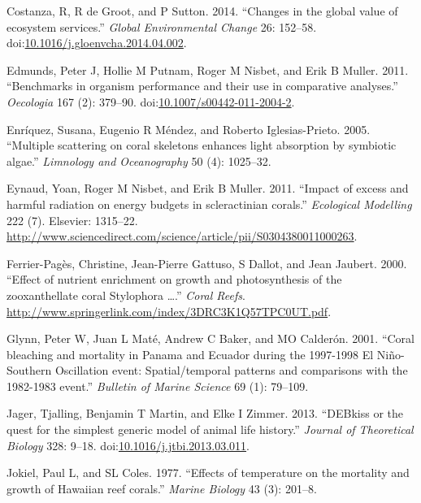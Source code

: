 \documentclass[]{elsarticle} %
\begin{document}
\hypertarget{refs}{}
\hypertarget{ref-Costanza:2014ex}{}
Costanza, R, R de Groot, and P Sutton. 2014. ``Changes in the global
value of ecosystem services.'' \emph{Global Environmental Change} 26:
152--58.
doi:\href{https://doi.org/10.1016/j.gloenvcha.2014.04.002}{10.1016/j.gloenvcha.2014.04.002}.

\hypertarget{ref-Edmunds:2011bv}{}
Edmunds, Peter J, Hollie M Putnam, Roger M Nisbet, and Erik B Muller.
2011. ``Benchmarks in organism performance and their use in comparative
analyses.'' \emph{Oecologia} 167 (2): 379--90.
doi:\href{https://doi.org/10.1007/s00442-011-2004-2}{10.1007/s00442-011-2004-2}.

\hypertarget{ref-Enriquez:2005p142}{}
Enríquez, Susana, Eugenio R Méndez, and Roberto Iglesias-Prieto. 2005.
``Multiple scattering on coral skeletons enhances light absorption by
symbiotic algae.'' \emph{Limnology and Oceanography} 50 (4): 1025--32.

\hypertarget{ref-Eynaud:2011tv}{}
Eynaud, Yoan, Roger M Nisbet, and Erik B Muller. 2011. ``Impact of
excess and harmful radiation on energy budgets in scleractinian
corals.'' \emph{Ecological Modelling} 222 (7). Elsevier: 1315--22.
\url{http://www.sciencedirect.com/science/article/pii/S0304380011000263}.

\hypertarget{ref-FerrierPages:2000p1950}{}
Ferrier-Pagès, Christine, Jean-Pierre Gattuso, S Dallot, and Jean
Jaubert. 2000. ``Effect of nutrient enrichment on growth and
photosynthesis of the zooxanthellate coral Stylophora \ldots{}.''
\emph{Coral Reefs}.
\url{http://www.springerlink.com/index/3DRC3K1Q57TPC0UT.pdf}.

\hypertarget{ref-Glynn:2001p7571}{}
Glynn, Peter W, Juan L Maté, Andrew C Baker, and MO Calderón. 2001.
``Coral bleaching and mortality in Panama and Ecuador during the
1997-1998 El Niño-Southern Oscillation event: Spatial/temporal patterns
and comparisons with the 1982-1983 event.'' \emph{Bulletin of Marine
Science} 69 (1): 79--109.

\hypertarget{ref-Jager:2013bj}{}
Jager, Tjalling, Benjamin T Martin, and Elke I Zimmer. 2013. ``DEBkiss
or the quest for the simplest generic model of animal life history.''
\emph{Journal of Theoretical Biology} 328: 9--18.
doi:\href{https://doi.org/10.1016/j.jtbi.2013.03.011}{10.1016/j.jtbi.2013.03.011}.

\hypertarget{ref-Jokiel:1977p7353}{}
Jokiel, Paul L, and SL Coles. 1977. ``Effects of temperature on the
mortality and growth of Hawaiian reef corals.'' \emph{Marine Biology} 43
(3): 201--8.
\end{document}
